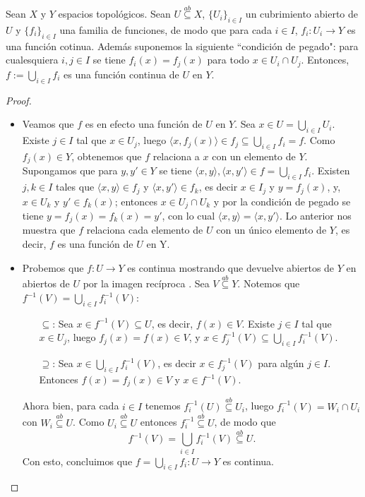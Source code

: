\begin{theorem}
   Sean $X$ y $Y$ espacios topológicos. Sean $U\stackrel{ab}\subseteq X$, $\{U_i\}_{i\in I}$ un cubrimiento abierto de $U$ y $\{f_i\}_{i\in I}$ una familia de funciones, de modo que para cada $i\in I$, $f_i:U_i\to Y$ es una función cotinua. Además suponemos la siguiente ``condición de pegado": para cualesquiera $i,j\in I$ se tiene $f_i(x)=f_j(x)$ para todo $x\in U_i \cap U_j$. Entonces, $f:=\bigcup_{i\in I}f_i$ es una función continua de $U$ en $Y$.
\end{theorem}
\begin{proof}
   \begin{itemize}
      \item Veamos que $f$ es en efecto una función de $U$ en $Y$. Sea $x\in U=\bigcup_{i\in I} U_i$. Existe $j\in I$ tal que $x\in U_j$, luego $\langle x,f_j(x)\rangle\in f_j \subseteq \bigcup_{i\in I} f_i =f$. Como $f_j(x)\in Y$, obtenemos que $f$ relaciona a $x$ con un elemento de $Y$. Supongamos que para $y,y'\in Y$ se tiene $\langle x,y\rangle, \langle x,y'\rangle\in f=\bigcup_{i\in I}f_i$. Existen $j,k\in I$ tales que $\langle x,y\rangle\in f_j$ y $\langle x,y'\rangle\in f_k$, es decir $x\in I_j$ y $y=f_j(x)$, y, $x\in U_k$ y $y'\in f_k(x)$; entonces $x\in U_j\cap U_k$ y por la condición de pegado se tiene $y=f_j(x)=f_k(x)=y'$, con lo cual $\langle x,y\rangle=\langle x,y'\rangle$. Lo anterior nos muestra que $f$ relaciona cada elemento de $U$ con un único elemento de $Y$, es decir, $f$ es una función de $U$ en Y.
      \item Probemos que $f:U\to Y$ es continua mostrando que devuelve abiertos de $Y$ en abiertos de $U$ por la imagen recíproca . Sea $V\stackrel{ab}\subseteq Y$. Notemos que $f^{-1}(V)=\bigcup_{i\in I} f_i^{-1}(V)$:
         \begin{itemize}
            \item[$\subseteq$:] Sea $x\in f^{-1}(V)\subseteq U$, es decir, $f(x)\in V$. Existe $j\in I$ tal que $x\in U_j$, luego $f_j(x)=f(x)\in V$, y $x\in f_j^{-1}(V)\subseteq\bigcup_{i\in I}f_i^{-1}(V)$. 
            \item[$\supseteq$:] Sea $x\in\bigcup_{i\in I} f_i^{-1}(V)$, es decir $x\in f_j^{-1}(V)$ para algún $j\in I$. Entonces $f(x)=f_j(x)\in V$ y $x\in f^{-1}(V)$.
         \end{itemize}
         Ahora bien, para cada $i\in I$ tenemos $f_i^{-1}(U)\stackrel{ab}\subseteq U_i$, luego $f_i^{-1}(V)=W_i\cap U_i$ con $W_i\stackrel{ab}\subseteq U$. Como $U_i \stackrel{ab}\subseteq U$ entonces $f_i^{-1} \stackrel{ab}\subseteq U$, de modo que
         $$
         f^{-1}(V)=\bigcup_{i\in I}f_i^{-1}(V) \stackrel{ab}\subseteq U. 
         $$
         Con esto, concluimos que $f=\bigcup_{i\in I}f_i:U\to  Y$ es continua.
   \end{itemize}
\end{proof}

